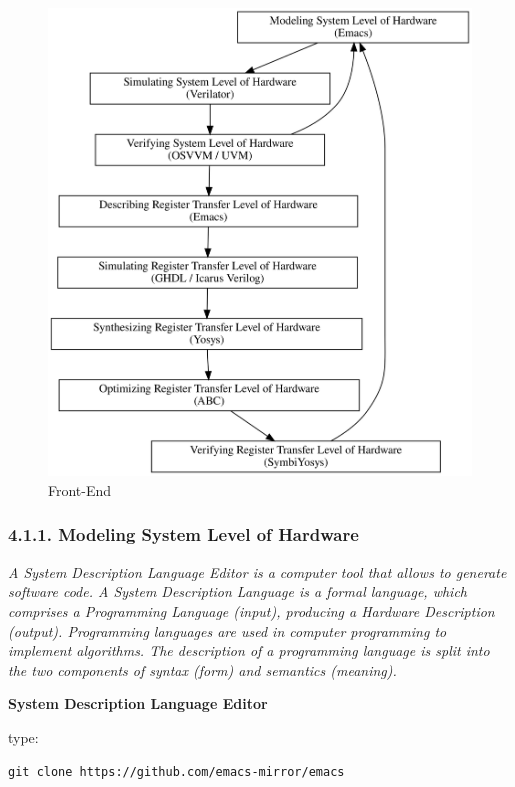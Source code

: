\documentclass[
]{article}
\begin{document}
\begin{figure}
\centering
\includegraphics{../doc/front-end.svg}
\caption{Front-End}
\end{figure}

\hypertarget{modeling-system-level-of-hardware}{%
\subsubsection{4.1.1. Modeling System Level of
Hardware}\label{modeling-system-level-of-hardware}}

\emph{A System Description Language Editor is a computer tool that
allows to generate software code. A System Description Language is a
formal language, which comprises a Programming Language (input),
producing a Hardware Description (output). Programming languages are
used in computer programming to implement algorithms. The description of
a programming language is split into the two components of syntax (form)
and semantics (meaning).}

\textbf{System Description Language Editor}

type:

\begin{verbatim}
git clone https://github.com/emacs-mirror/emacs
\end{verbatim}
\end{document}
